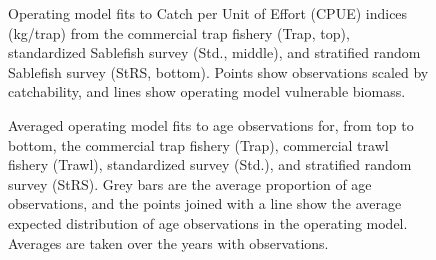 \documentclass[11pt]{book}
\begin{document}
\begin{figure}[htb]

{\centering {} 

}

\caption{Operating model fits to Catch per Unit of Effort (CPUE) indices (kg/trap) from the commercial trap fishery (Trap, top), standardized Sablefish survey (Std., middle), and stratified random Sablefish survey (StRS, bottom). Points show observations scaled by catchability, and lines show operating model vulnerable biomass.}\label{fig:unnamed-chunk-17}
\end{figure}
\newpage
\begin{figure}[htb]

{\centering {} 

}

\caption{Averaged operating model fits to age observations for, from top to bottom, the commercial trap fishery (Trap), commercial trawl fishery (Trawl), standardized survey (Std.), and stratified random survey (StRS). Grey bars are the average proportion of age observations, and the points joined with a line show the average expected distribution of age observations in the operating model. Averages are taken over the years with observations.}\label{fig:unnamed-chunk-18}
\end{figure}
\newpage
\end{document}
